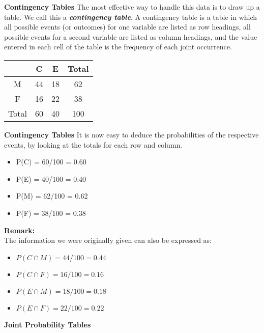 \documentclass[]{report}
\begin{document}
{
	\noindent \textbf{Contingency Tables}
	The most effective way to handle this data is to draw up a table. We call this a \textbf{\emph{contingency table}}.
	A contingency table is a table in which all possible events (or outcomes) for one variable are listed as
	row headings, all possible events for a second variable are listed as column headings, and the value entered in
	each cell of the table is the frequency of each joint occurrence.
	
	
	\begin{center}
		\begin{tabular}{|c||c|c||c|}
			\hline
			& C & E & Total \\ \hline \hline
			M & 44 & 18 & 62 \\ \hline
			F & 16 & 22 & 38 \\ \hline \hline
			Total & 60 & 40 & 100 \\ \hline
		\end{tabular}
	\end{center}
	

	\noindent \textbf{Contingency Tables}
	It is now easy to deduce the probabilities of the respective events, by looking at the totals for each row and column.
{
	\large	
		\begin{multicols}{2}

	\begin{itemize}
		\item P(C) = 60/100 = 0.60
		\item P(E) = 40/100 = 0.40
		\item P(M) = 62/100 = 0.62
		\item P(F) = 38/100 = 0.38
	\end{itemize}
	\end{multicols}
}
\noindent 	\textbf{Remark:}\\
	The information we were originally given can also be expressed as:
\begin{multicols}{2}
\begin{itemize}
		\item $P(C \cap M) = 44/100 = 0.44$
		\item $P(C \cap F) = 16/100 = 0.16$
		\item $P(E \cap M) = 18/100 = 0.18$
		\item $P(E \cap F) = 22/100 = 0.22$
\end{itemize}
\end{multicols}
	\noindent \textbf{Joint Probability Tables}
	
}
\end{document}
